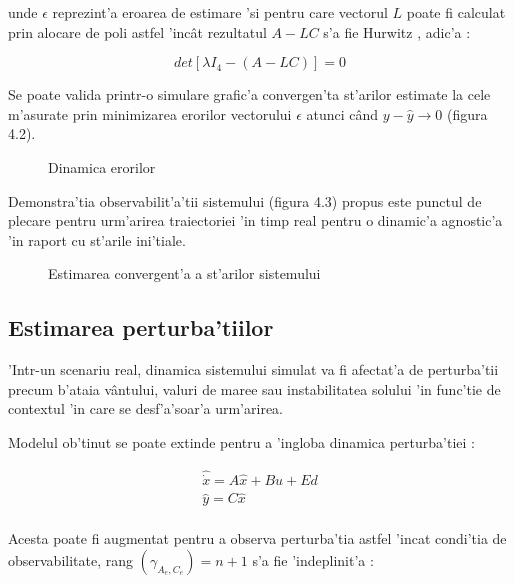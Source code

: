 \documentclass[12pt,a4paper,twoside]{report}
\begin{document}
unde $\epsilon$ reprezint'a eroarea de estimare 'si pentru care vectorul $L$ poate fi calculat prin alocare de poli astfel 'inc\^{a}t rezultatul $A-LC$ s'a fie Hurwitz \cite{PolePlacemet}, adic'a :

\begin{equation}
    det[\lambda I_4 - (A - LC)] = 0
\end{equation}

Se poate valida printr-o simulare grafic'a convergen'ta st'arilor estimate la cele m'asurate prin minimizarea erorilor vectorului $\epsilon$ atunci c\^{a}nd $y - \hat y \to 0$ (figura 4.2).


\begin{figure}[h]
  \centering
  
  \caption{Dinamica erorilor}
\end{figure}

Demonstra'tia observabilit'a'tii sistemului (figura 4.3) propus este punctul de plecare pentru urm'arirea traiectoriei 'in timp real pentru o dinamic'a agnostic'a 'in raport cu st'arile ini'tiale.

\begin{figure}[h]
  \hspace*{-3.5cm}
  
  \caption{Estimarea convergent'a a st'arilor sistemului}
\end{figure}

\subsection{Estimarea perturba'tiilor}

'Intr-un scenariu real, dinamica sistemului simulat va fi afectat'a de perturba'tii precum b'ataia v\^{a}ntului, valuri de maree sau instabilitatea solului 'in func'tie de contextul 'in care se desf'a'soar'a urm'arirea.

\vspace{5px}

Modelul ob'tinut se poate extinde pentru a 'ingloba dinamica perturba'tiei \cite{Estimation}:


\begin{gather}
    \hat{\dot x} = A \hat x + Bu +  E d \\
    \hat y = C \hat x \\
\end{gather}

Acesta poate fi augmentat pentru a observa perturba'tia astfel 'incat condi'tia de observabilitate, rang $(\gamma_{A_e,C_e}) = n+1$ s'a fie 'indeplinit'a \cite{Estimation}:
\end{document}
